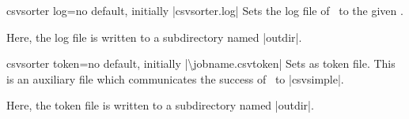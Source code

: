 \documentclass[a4paper,11pt]{ltxdoc}
\begin{document}
\begin{docCsvKey}{csvsorter log}{=}{no default, initially |csvsorter.log|}
  Sets the log file of \csvsorter\ to the given .
\begin{dispListing}
\end{dispListing}
  Here, the log file is written to a subdirectory named |outdir|.
\end{docCsvKey}

\clearpage
\begin{docCsvKey}{csvsorter token}{=}{no default, initially |\textbackslash jobname.csvtoken|}
  Sets  as token file. This is an auxiliary file which
  communicates the success of \csvsorter\ to |csvsimple|.
\begin{dispListing}
\end{dispListing}
  Here, the token file is written to a subdirectory named |outdir|.
\end{docCsvKey}
\end{document}
